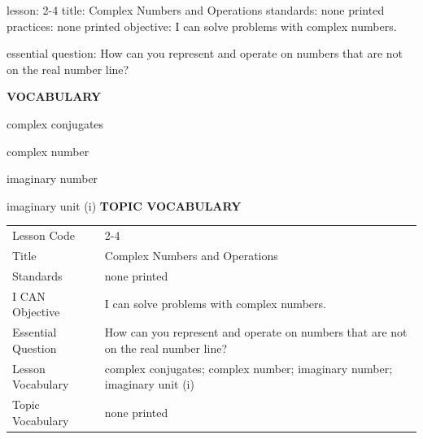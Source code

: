 \documentclass{article}
\newenvironment{lesson-meta}{}{}        %
\newcommand{\te}[1]{}                   %
\begin{document}
\begin{lesson-meta}
lesson: 2-4
title: Complex Numbers and Operations
standards: none printed
practices: none printed
objective: I can solve problems with complex numbers.

essential question: How can you represent and operate on numbers that are not on the real number line?

\textbf{VOCABULARY}
\item complex conjugates
\item complex number
\item imaginary number
\item imaginary unit (i)
\textbf{TOPIC VOCABULARY}
\te{No topic vocabulary list is printed on these pages.}
\begin{tabular}{ll}
Lesson Code & 2-4 \\
Title & Complex Numbers and Operations \\
Standards & none printed \\
I CAN Objective & I can solve problems with complex numbers. \\
Essential Question & How can you represent and operate on numbers that are not on the real number line? \\
Lesson Vocabulary & complex conjugates; complex number; imaginary number; imaginary unit (i) \\
Topic Vocabulary & none printed \\
\end{tabular}
\end{lesson-meta}
\end{document}
